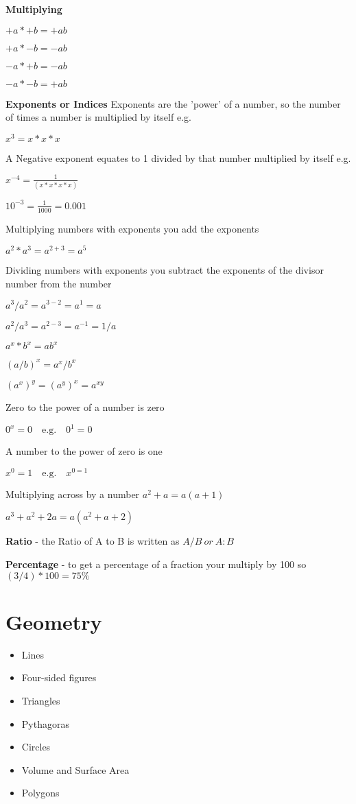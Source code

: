 \documentclass{article}
\begin{document}
\textbf{Multiplying}

$+a * +b = +ab$

$+a * -b = -ab$

$-a * +b = -ab$

$-a * -b = +ab$

\textbf{Exponents or Indices}
Exponents are the 'power' of a number, so the number of times a number is multiplied by itself e.g.

$x^{3} = x * x * x$

A Negative exponent equates to 1 divided by that number multiplied by itself e.g.

$x^{-4} = \frac{1}{(x * x * x * x)}$

$ 10^{-3}  = \frac{1}{1000} = 0.001 $


Multiplying numbers with exponents you add the exponents 

$a^{2} * a^{3} = a^{2+3} = a^{5}$

Dividing numbers with exponents you subtract the exponents of the divisor number from the number 

$a^{3} / a^{2} = a^{3-2} = a^{1} = a$

$a^{2} / a^{3} = a^{2-3} = a^{-1} = 1/a$

$ a^{x} * b^{x} = ab^{x}$

$ (a/b)^{x} = a^{x} / b^{x} $

$ (a^{x})^{y} =  (a^{y})^{x}  = a^{xy}$


Zero to the power of a number is zero

$ 0^{x} = 0 \quad \textrm{e.g.} \quad  0^{1} = 0$

A number to the power of zero is one

$ x^{0} = 1 \quad \textrm{e.g.} \quad  x^{0 =1}$

Multiplying across by a number 
$a^{2} + a = a (a + 1) $

$a^{3} + a^{2} + 2a = a (a^{2} + a  + 2 )$


\textbf{Ratio} - the Ratio of A to B is written as $ A/B \ or \ A : B$


\textbf{Percentage} - to get a percentage of a fraction your multiply by 100 so $ ( 3/4 ) * 100 = 75\%$

\newpage
\section{Geometry}

\begin{itemize}
\item Lines
\item Four-sided figures
\item Triangles
\item Pythagoras
\item Circles
\item Volume and Surface Area
\item Polygons
\end{itemize}
\end{document}
